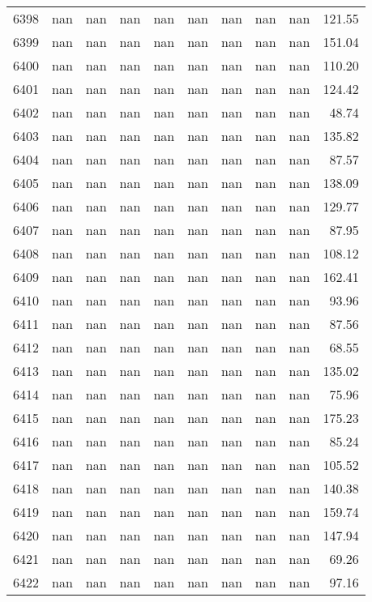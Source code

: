 \begin{tabular}{lrrrrrrrrr}
6398 & nan & nan & nan & nan & nan & nan & nan & nan & 121.55 \\
6399 & nan & nan & nan & nan & nan & nan & nan & nan & 151.04 \\
6400 & nan & nan & nan & nan & nan & nan & nan & nan & 110.20 \\
6401 & nan & nan & nan & nan & nan & nan & nan & nan & 124.42 \\
6402 & nan & nan & nan & nan & nan & nan & nan & nan & 48.74 \\
6403 & nan & nan & nan & nan & nan & nan & nan & nan & 135.82 \\
6404 & nan & nan & nan & nan & nan & nan & nan & nan & 87.57 \\
6405 & nan & nan & nan & nan & nan & nan & nan & nan & 138.09 \\
6406 & nan & nan & nan & nan & nan & nan & nan & nan & 129.77 \\
6407 & nan & nan & nan & nan & nan & nan & nan & nan & 87.95 \\
6408 & nan & nan & nan & nan & nan & nan & nan & nan & 108.12 \\
6409 & nan & nan & nan & nan & nan & nan & nan & nan & 162.41 \\
6410 & nan & nan & nan & nan & nan & nan & nan & nan & 93.96 \\
6411 & nan & nan & nan & nan & nan & nan & nan & nan & 87.56 \\
6412 & nan & nan & nan & nan & nan & nan & nan & nan & 68.55 \\
6413 & nan & nan & nan & nan & nan & nan & nan & nan & 135.02 \\
6414 & nan & nan & nan & nan & nan & nan & nan & nan & 75.96 \\
6415 & nan & nan & nan & nan & nan & nan & nan & nan & 175.23 \\
6416 & nan & nan & nan & nan & nan & nan & nan & nan & 85.24 \\
6417 & nan & nan & nan & nan & nan & nan & nan & nan & 105.52 \\
6418 & nan & nan & nan & nan & nan & nan & nan & nan & 140.38 \\
6419 & nan & nan & nan & nan & nan & nan & nan & nan & 159.74 \\
6420 & nan & nan & nan & nan & nan & nan & nan & nan & 147.94 \\
6421 & nan & nan & nan & nan & nan & nan & nan & nan & 69.26 \\
6422 & nan & nan & nan & nan & nan & nan & nan & nan & 97.16 \\

\end{tabular}
